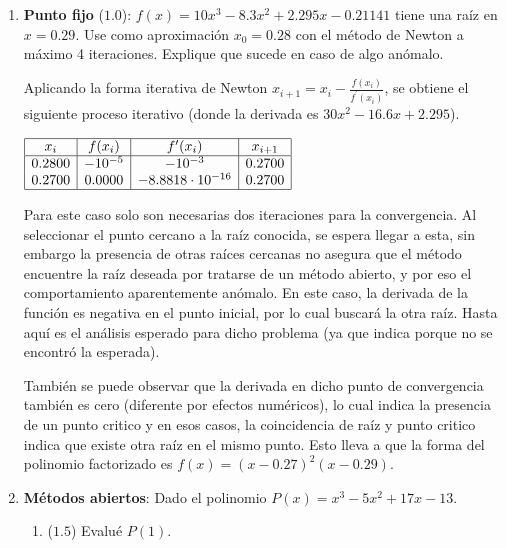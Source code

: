 \documentclass[12pt]{article}
\begin{document}
  \begin{enumerate}[leftmargin=*,widest=9]
    \item \textbf{Punto fijo} ($1.0$): \(f(x) = 10x^3 - 8.3x^2 + 2.295x - 0.21141\) tiene una raíz en \(x=0.29\). Use como aproximación \(x_0=0.28\) con el método de Newton a máximo 4 iteraciones. Explique que sucede en caso de algo anómalo.
    
    Aplicando la forma iterativa de Newton \(x_{i+1} = x_i - \frac{f(x_i)}{f^\prime (x_i)} \), se obtiene el siguiente proceso iterativo (donde la derivada es \(30x^2 - 16.6x + 2.295 \)).
    \begin{center}
       \(
    \begin{array}{|c|c|c|c|}
    \hline
    x_i & f(x_i) & f^\prime (x_i) & x_{i+1} \\
    \hline
    0.2800 & -10^{-5} & -10^{-3} & 0.2700\\
    0.2700 & 0.0000 & -8.8818\cdot 10^{-16} & 0.2700\\
    \hline
    \end{array}
    \) 
    \end{center}

Para este caso solo son necesarias dos iteraciones para la convergencia. Al seleccionar el punto cercano a la raíz conocida, se espera llegar a esta, sin embargo la presencia de otras raíces cercanas no asegura que el método encuentre la raíz deseada por tratarse de un método abierto, y por eso el comportamiento aparentemente anómalo. En este caso, la derivada de la función es negativa en el punto inicial, por lo cual buscará la otra raíz. Hasta aquí es el análisis esperado para dicho problema (ya que indica porque no se encontró la esperada).
    
También se puede observar que la derivada en dicho punto de convergencia también es cero (diferente por efectos numéricos), lo cual indica la presencia de un punto critico y en esos casos, la coincidencia de raíz y punto critico indica que existe otra raíz en el mismo punto. Esto lleva a que la forma del polinomio factorizado es \(f(x) = (x-0.27)^2(x-0.29)\).
    

    \item \textbf{Métodos abiertos}: Dado el polinomio \(P(x) = x^3 - 5x^2 + 17x -13\). 
    
    \begin{enumerate}[label=\alph*]
    
    \item ($1.5$) Evalué \(P(1)\).
    

\end{enumerate}
\end{enumerate}
\end{document}

